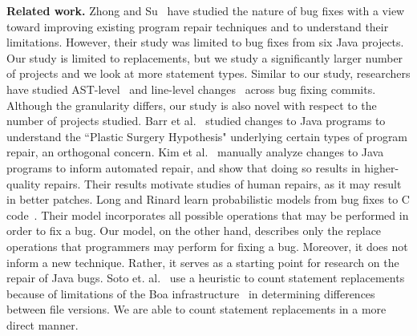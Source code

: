 \vspace{1ex} \noindent\textbf{Related work.} Zhong and Su~\cite{zhong2015} have studied the nature of bug fixes with a view toward improving existing program repair techniques and to understand their limitations. However, their study was limited to bug fixes from six Java projects. Our study is limited to replacements, but we study a significantly larger number of projects and we look at more statement types. Similar to our study, researchers have studied AST-level~\cite{Martinez:2015ez} and line-level changes~\cite{Asaduzzaman:2013df} across bug fixing commits. Although the granularity differs, our study is also novel with respect to the number of projects studied. Barr et al.~\cite{Barr2014} studied changes to Java programs to understand the ``Plastic Surgery Hypothesis" underlying certain types of program repair, an orthogonal concern. Kim et al.~\cite{kim2013} manually analyze changes to Java programs to inform automated repair, and show that doing so results in higher-quality repairs. Their results motivate studies of human repairs, as it may result in better patches. Long and Rinard learn probabilistic models from bug fixes to C code~\cite{Long2016}. Their model incorporates all possible operations that may be performed in order to fix a bug. Our model, on the other hand, describes only the replace operations that programmers may perform for fixing a bug. Moreover, it does not inform a new technique. Rather, it serves as a starting point for research on the repair of Java bugs. Soto et. al.~\cite{soto} use a heuristic to count statement replacements because of limitations of the Boa infrastructure~\cite{Dyer2013} in determining differences between file versions. We are able to count statement replacements in a more direct manner.

